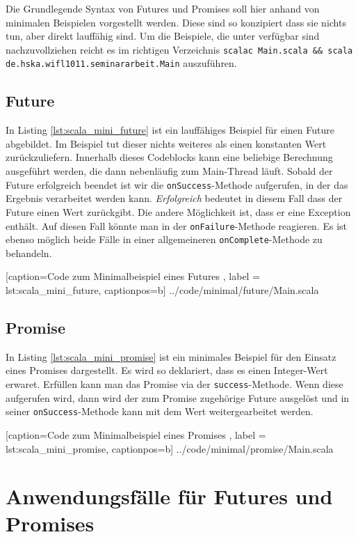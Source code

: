 \documentclass[11pt,a4paper,titlepage,ngerman]{scrartcl}
\begin{document}
Die Grundlegende Syntax von Futures und Promises soll hier anhand von minimalen
Beispielen vorgestellt werden. Diese sind so konzipiert dass sie nichts
tun, aber direkt lauffähig sind. Um die Beispiele, die unter \cite{code}
verfügbar sind nachzuvollziehen reicht es im richtigen Verzeichnis 
\texttt{scalac Main.scala \&\& scala de.hska.wifl1011.seminararbeit.Main} auszuführen.

\subsection{Future}

In Listing \ref{lst:scala_mini_future} ist ein lauffähiges Beispiel für einen 
Future abgebildet. Im Beispiel tut dieser nichts weiteres als einen konstanten
Wert zurückzuliefern. Innerhalb dieses Codeblocks kann eine beliebige Berechnung
ausgeführt werden, die dann nebenläufig zum Main-Thread läuft. Sobald der Future
erfolgreich beendet ist wir die \texttt{onSuccess}-Methode aufgerufen, in der
das Ergebnis verarbeitet werden kann. \emph{Erfolgreich} bedeutet in diesem
Fall dass der Future einen Wert zurückgibt. Die andere Möglichkeit ist, dass
er eine Exception enthält. Auf diesen Fall könnte man in der \texttt{onFailure}-Methode
reagieren. Es ist ebenso möglich beide Fälle in einer allgemeineren
\texttt{onComplete}-Methode zu behandeln.


    [caption={Code zum Minimalbeispiel eines Futures },
       label = lst:scala_mini_future,
       captionpos=b]
 {../code/minimal/future/Main.scala}

\subsection{Promise}

In Listing \ref{lst:scala_mini_promise} ist ein minimales Beispiel für den
Einsatz eines Promises dargestellt. Es wird so deklariert, dass es einen
Integer-Wert erwaret. Erfüllen kann man das Promise via der \texttt{success}-Methode.
Wenn diese aufgerufen wird, dann wird der zum Promise zugehörige Future ausgelöst
und in seiner \texttt{onSuccess}-Methode kann mit dem Wert weitergearbeitet werden.


    [caption={Code zum Minimalbeispiel eines Promises },
       label = lst:scala_mini_promise,
       captionpos=b]
 {../code/minimal/promise/Main.scala}

\section{Anwendungsfälle für Futures und Promises}
\end{document}
